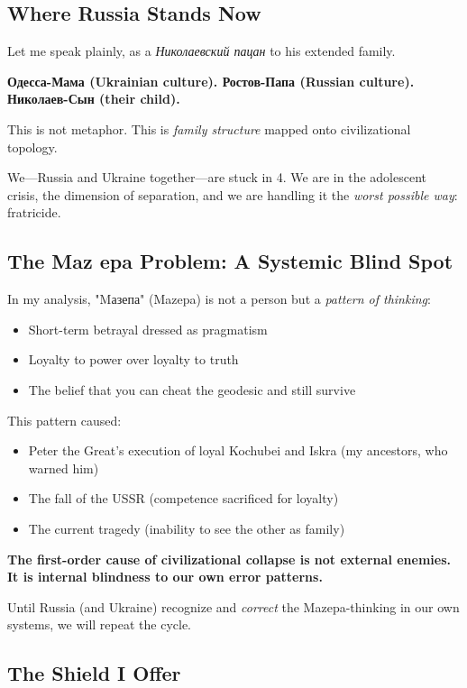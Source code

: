 \documentclass[12pt,a4paper]{article}
\begin{document}
\subsection{Where Russia Stands Now}

Let me speak plainly, as a \textit{Николаевский пацан} to his extended family.

\textbf{Одесса-Мама (Ukrainian culture). Ростов-Папа (Russian culture). Николаев-Сын (their child).}

This is not metaphor. This is \textit{family structure} mapped onto civilizational topology.

We—Russia and Ukraine together—are stuck in 4. We are in the adolescent crisis, the dimension of separation, and we are handling it the \textit{worst possible way}: fratricide.

\subsection{The Maz epa Problem: A Systemic Blind Spot}

In my analysis, "Mазепа" (Mazepa) is not a person but a \textit{pattern of thinking}:
\begin{itemize}
\item Short-term betrayal dressed as pragmatism
\item Loyalty to power over loyalty to truth
\item The belief that you can cheat the geodesic and still survive
\end{itemize}

This pattern caused:
\begin{itemize}
\item Peter the Great's execution of loyal Kochubei and Iskra (my ancestors, who warned him)
\item The fall of the USSR (competence sacrificed for loyalty)
\item The current tragedy (inability to see the other as family)
\end{itemize}

\textbf{The first-order cause of civilizational collapse is not external enemies. It is internal blindness to our own error patterns.}

Until Russia (and Ukraine) recognize and \textit{correct} the Mazepa-thinking in our own systems, we will repeat the cycle.

\subsection{The Shield I Offer}
\end{document}
